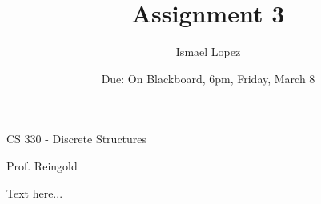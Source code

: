 \documentclass[12pt, letterpaper]{amsart}
\theoremstyle{remark}
\numberwithin{equation}{section} \numberwithin{thm}{section}
\numberwithin{rmk}{section} \numberwithin{figure}{section}
\newcommand{\class}[1]{#1\\}
\newcommand{\professor}[1]{Prof. #1\\}
\newenvironment{coverpage}{\begin{center}\topskip0pt \vspace*{\fill}}{
\vspace{-2in}
{\huge \thetitle} \vspace{0.5in} \par
{\large \textbf{\thedate}} \par
{\large \class{CS 330 - Discrete Structures}} \par \vspace{0.05in}
{\large \professor{Reingold}} \par
\vspace{0.4in}
{\large \textbf{\theauthor}}

\vspace*{\fill} \end{center}}
\begin{document}
\begin{coverpage}
    \title{Assignment 3}
    \author{Ismael Lopez}
    \date{Due: On Blackboard, 6pm, Friday, March 8}
\end{coverpage}
	Text here...
\end{document}
